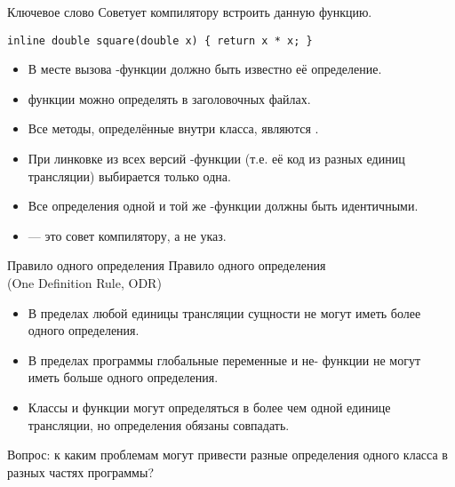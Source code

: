 \documentclass{beamer}
\begin{document}
\begin{frame}[fragile]{Ключевое слово }
    Советует компилятору встроить данную функцию.
\begin{lstlisting}
inline double square(double x) { return x * x; }
\end{lstlisting}
\begin{itemize}
    \item В месте вызова -функции должно 
        быть известно её определение.

    \item {} функции можно определять 
        в заголовочных файлах.

    \item Все методы, определённые внутри класса, являются
        .

    \item При линковке из всех версий -функции
        (т.е. её код из разных единиц трансляции)
        выбирается только одна.

    \item Все определения одной и той же -функции
        должны быть идентичными.

    \item {} — это совет компилятору, а не указ.
\end{itemize}
\end{frame}

\begin{frame}[fragile]{Правило одного определения}
Правило одного определения\\ (One Definition Rule, ODR)
\begin{itemize}
    \item В пределах любой единицы трансляции сущности не могут иметь более одного определения. 
    \item В пределах программы глобальные переменные и не- функции не могут иметь больше
        одного определения.
    \item Классы и  функции могут определяться в более чем одной единице
        трансляции, но определения обязаны совпадать.
\end{itemize}
Вопрос: к каким проблемам могут привести разные
определения одного класса в разных частях программы?
\end{frame}
\end{document}
